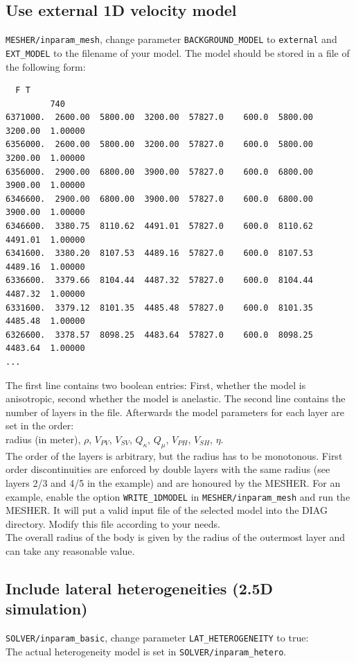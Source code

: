 \documentclass{article}
\begin{document}
\subsection{Use external 1D velocity model}
\verb|MESHER/inparam_mesh|, change parameter \verb|BACKGROUND_MODEL| to \verb|external| and \verb|EXT_MODEL| to the filename of your model. The model should be stored in a file of the following form:
\begin{verbatim}
  F T
         740
6371000.  2600.00  5800.00  3200.00  57827.0    600.0  5800.00  3200.00  1.00000
6356000.  2600.00  5800.00  3200.00  57827.0    600.0  5800.00  3200.00  1.00000
6356000.  2900.00  6800.00  3900.00  57827.0    600.0  6800.00  3900.00  1.00000
6346600.  2900.00  6800.00  3900.00  57827.0    600.0  6800.00  3900.00  1.00000
6346600.  3380.75  8110.62  4491.01  57827.0    600.0  8110.62  4491.01  1.00000
6341600.  3380.20  8107.53  4489.16  57827.0    600.0  8107.53  4489.16  1.00000
6336600.  3379.66  8104.44  4487.32  57827.0    600.0  8104.44  4487.32  1.00000
6331600.  3379.12  8101.35  4485.48  57827.0    600.0  8101.35  4485.48  1.00000
6326600.  3378.57  8098.25  4483.64  57827.0    600.0  8098.25  4483.64  1.00000
...
\end{verbatim}
The first line contains two boolean entries: First, whether the model is anisotropic, second whether the model is anelastic. The second line contains the number of layers in the file. Afterwards the model parameters for each layer are set in the order:\\
radius (in meter), $\rho$, $V_{PV}$, $V_{SV}$, $Q_{\kappa}$, $Q_{\mu}$,  $V_{PH}$, $V_{SH}$, $\eta$. \\
The order of the layers is arbitrary, but the radius has to be monotonous. First order discontinuities are enforced by double layers with the same radius (see layers 2/3 and 4/5 in the example) and are honoured by the MESHER. For an example, enable the option \verb|WRITE_1DMODEL| in \verb|MESHER/inparam_mesh| and run the MESHER. It will put a valid input file of the selected model into the DIAG directory. Modify this file according to your needs.\\
The overall radius of the body is given by the radius of the outermost layer and can take any reasonable value.

\subsection{Include lateral heterogeneities (2.5D simulation)}
\verb|SOLVER/inparam_basic|, change parameter \verb|LAT_HETEROGENEITY| to true:\\
The actual heterogeneity model is set in \verb|SOLVER/inparam_hetero|. 
\end{document}
